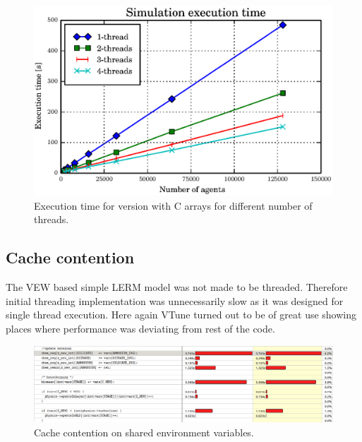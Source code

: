 \documentclass[12pt, a4paper]{report}
\begin{document}
\begin{figure}[H]
  \begin{center}
    \includegraphics[width=\columnwidth]{graphs/dict-array-multi-4-perf.eps}
    \caption{Execution time for version with C arrays for different number of threads.}
    \label{fig:dict-array-multi-4-perf}
  \end{center}
\end{figure}

\subsection{Cache contention}\label{subsec:cache-contetion}
The VEW based simple LERM model was not made to be threaded. Therefore initial threading
implementation was unnecessarily slow as it was designed for single thread execution.
Here again VTune turned out to be of great use showing places where performance was
deviating from rest of the code.

\begin{figure}[H]
  \begin{center}
    \includegraphics[width=\textwidth,natwidth=1174,natheight=332]{images/cache-cont-before.png}
    \caption{Cache contention on shared environment variables.}
    \label{fig:cache-contention-before}
  \end{center}
\end{figure}
\end{document}
